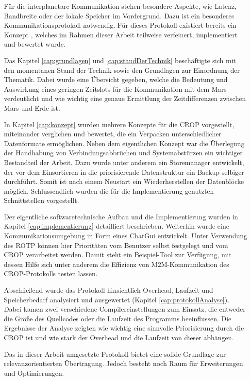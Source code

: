 
Für die interplanetare Kommunikation stehen besondere Aspekte, wie Latenz,
Bandbreite oder der lokale Speicher im Vordergrund. Dazu ist ein besonderes
Kommunikationsprotokoll notwendig. Für dieses Protokoll existiert
bereits ein Konzept \cite{Daher}, welches im Rahmen dieser Arbeit
teilweise verfeinert, implementiert und bewertet wurde.

Das Kapitel \ref{cap:grundlagen} und \ref{cap:standDerTechnik} beschäftigte sich
mit den momentanen Stand der Technik sowie den Grundlagen zur Einordnung der
Thematik. Dabei wurde eine Übersicht gegeben, welche die Bedeutung und
Auswirkung eines geringen Zeitslots für die Kommunikation mit dem Mars
verdeutlicht und wie wichtig eine genaue Ermittlung der Zeitdifferenzen zwischen
Mars und Erde ist.

In Kapitel \ref{cap:konzept} wurden mehrere Konzepte für die CROP vorgestellt,
miteinander verglichen und bewertet, die ein Verpacken unterschiedlicher
Datenformate ermöglichen. Neben dem eigentlichen Konzept war die Überlegung der
Handhabung von Verbindungsabbrüchen und Systemabstürzen ein wichtiger
Bestandteil der Arbeit. Dazu wurde unter anderem ein Storemanager entwickelt,
der vor dem Einsortieren in die priorisierende Datenstruktur ein Backup selbiger
durchführt. Somit ist nach einem Neustart ein Wiederherstellen der Datenblöcke
möglich. Schlussendlich wurden die für die Implementierung genutzten
Schnittstellen vorgestellt.

Der eigentliche softwaretechnische Aufbau und die Implementierung wurden in
Kapitel \ref{cap:implementierung} detailliert beschrieben. Weiterhin wurde eine
Kommunikationsumgebung in Form eines ChatGui entwickelt. Unter Verwendung des ROTP
können hier Prioritäten vom Benutzer selbst festgelegt und vom CROP verarbeitet
werden. Damit steht ein Beispiel-Tool zur Verfügung, mit dessen Hilfe sich
unter anderem die Effizienz von M$2$M-Kommunikation des CROP-Protokolls testen
lassen.

Abschließend wurde das Protokoll hinsichtlich Overhead, Laufzeit und
Speicherbedarf analysiert und ausgewertet (Kapitel \ref{cap:protokollAnalyse}).
Dabei kamen zwei verschiedene Compilereinstellungen zum Einsatz, die entweder
die Größe des Quellcodes oder die Laufzeit des Programms beeinflussen. Die
Ergebnisse der Analyse zeigten wie wichtig eine sinnvolle Priorisierung durch
die CROP ist und wie stark der Overhead und die Laufzeit von dieser abhängen.

Das in dieser Arbeit umgesetzte Protokoll bietet eine solide
Grundlage zur relevanzorientierten Übertragung. Jedoch besteht noch Raum
für Erweiterungen und Optimierungen.

